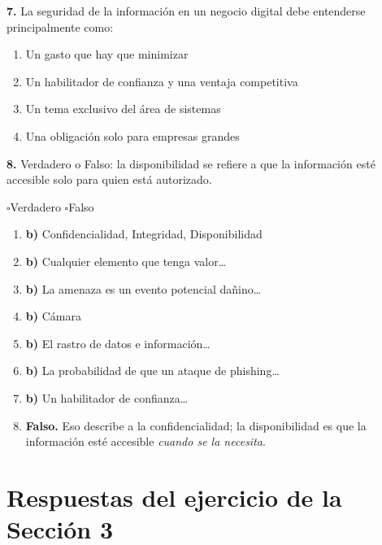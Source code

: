 \documentclass[12pt,a4paper]{article}
\newcommand{\checkboxVacio}{$\square$\;}
\begin{document}
\textbf{7.} La seguridad de la información en un negocio digital debe entenderse
principalmente como:
\begin{enumerate}[label=\alph*), leftmargin=2.5em]
  \item Un gasto que hay que minimizar
  \item Un habilitador de confianza y una ventaja competitiva
  \item Un tema exclusivo del área de sistemas
  \item Una obligación solo para empresas grandes
\end{enumerate}

\textbf{8.} Verdadero o Falso: la disponibilidad se refiere a que la información
esté accesible solo para quien está autorizado.

\vspace{4pt}
\checkboxVacio Verdadero \qquad \checkboxVacio Falso

\vspace{12pt}
\begin{tcolorbox}[colback=verdeOK!10, colframe=verdeOK,
                  title={\ding{51}\; Clave de respuestas}, arc=3mm]
\begin{enumerate}[leftmargin=2em]
  \item \textbf{b)} Confidencialidad, Integridad, Disponibilidad
  \item \textbf{b)} Cualquier elemento que tenga valor\ldots
  \item \textbf{b)} La amenaza es un evento potencial dañino\ldots
  \item \textbf{b)} Cámara
  \item \textbf{b)} El rastro de datos e información\ldots
  \item \textbf{b)} La probabilidad de que un ataque de phishing\ldots
  \item \textbf{b)} Un habilitador de confianza\ldots
  \item \textbf{Falso.} Eso describe a la confidencialidad; la disponibilidad es
        que la información esté accesible \emph{cuando se la necesita}.
\end{enumerate}
\end{tcolorbox}

\newpage
\section{Respuestas del ejercicio de la Sección 3}
\end{document}
